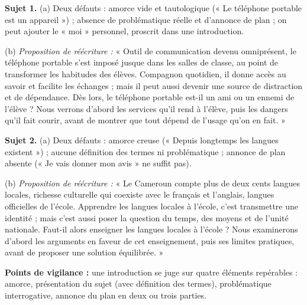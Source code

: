\documentclass[11pt]{article}
\begin{document}
\begin{corrige}
\textbf{Sujet 1.} (a) Deux défauts : amorce vide et tautologique (« Le téléphone portable est un appareil ») ; absence de problématique réelle et d'annonce de plan ; on peut ajouter le « moi » personnel, proscrit dans une introduction.

(b) \emph{Proposition de réécriture :} « Outil de communication devenu omniprésent, le téléphone portable s'est imposé jusque dans les salles de classe, au point de transformer les habitudes des élèves. Compagnon quotidien, il donne accès au savoir et facilite les échanges ; mais il peut aussi devenir une source de distraction et de dépendance. Dès lors, le téléphone portable est-il un ami ou un ennemi de l'élève ? Nous verrons d'abord les services qu'il rend à l'élève, puis les dangers qu'il fait courir, avant de montrer que tout dépend de l'usage qu'on en fait. »

\textbf{Sujet 2.} (a) Deux défauts : amorce creuse (« Depuis longtemps les langues existent ») ; aucune définition des termes ni problématique ; annonce de plan absente (« Je vais donner mon avis » ne suffit pas).

(b) \emph{Proposition de réécriture :} « Le Cameroun compte plus de deux cents langues locales, richesse culturelle qui coexiste avec le français et l'anglais, langues officielles de l'école. Apprendre les langues locales à l'école, c'est transmettre une identité ; mais c'est aussi poser la question du temps, des moyens et de l'unité nationale. Faut-il alors enseigner les langues locales à l'école ? Nous examinerons d'abord les arguments en faveur de cet enseignement, puis ses limites pratiques, avant de proposer une solution équilibrée. »

\textbf{Points de vigilance :} une introduction se juge sur quatre éléments repérables : amorce, présentation du sujet (avec définition des termes), problématique interrogative, annonce du plan en deux ou trois parties.
\end{corrige}
\end{document}
